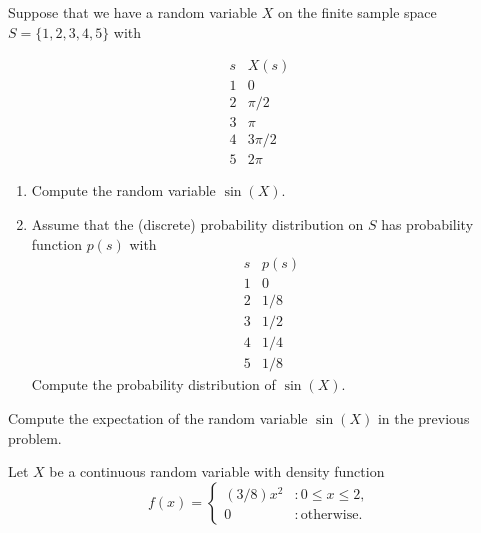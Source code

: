 \documentclass[12pt,reqno]{amsart}
\begin{document}
\bigskip
\prob Suppose that we have a random variable $X$ on the finite sample space $S = \{1,2,3,4,5\}$ with

    \[\begin{array}{c|c}
        s & X(s)  \\ \hline
        1 & 0  \\
        2 & \pi/2  \\
        3 & \pi \\
        4 & 3\pi/2 \\
        5 & 2\pi
    \end{array}\]

\medskip
\begin{enumerate}
    \item Compute the random variable $\sin{(X)}$.\vfill
    
    

    \item Assume that the (discrete) probability distribution on $S$ has probability function $p(s)$ with
        \[\begin{array}{c|c}
            s & p(s)  \\ \hline
            1 & 0  \\
            2 & 1/8  \\
            3 & 1/2 \\
            4 & 1/4 \\
            5 & 1/8
        \end{array}\]
    Compute the probability distribution of $\sin(X)$.\vfill

    
\end{enumerate}
















\newpage
\prob Compute the expectation of the random variable $\sin(X)$ in the previous problem.\vfill













\bigskip
\prob Let $X$ be a continuous random variable with density function
\[f(x) = \begin{cases}
    (3/8)x^2 & : 0 \leq x \leq 2, \\
    0 & : \text{otherwise}.
\end{cases}\]
\end{document}
